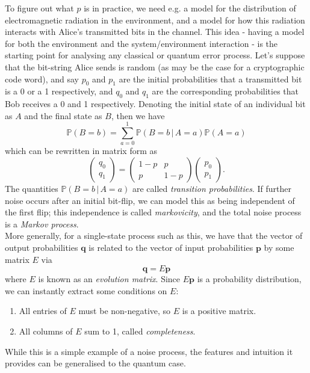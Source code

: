 \documentclass[12pt,a4paper]{report}
\numberwithin{equation}{section}
\theoremstyle{definition}
\theoremstyle{theorem}
\theoremstyle{theorem}
\theoremstyle{example}
\theoremstyle{definition}
\begin{document}
To figure out what $p$ is in practice, we need e.g. a model for the distribution of electromagnetic radiation in the environment, and a model for how this radiation interacts with Alice's transmitted bits in the channel. This idea - having a model for both the environment and the system/environment interaction - is the starting point for analysing any classical or quantum error process. Let's suppose that the bit-string Alice sends is random (as may be the case for a cryptographic code word), and say $p_{0}$ and $p_{1}$ are the initial probabilities that a transmitted bit is a 0 or a 1 respectively, and $q_{0}$ and $q_{1}$ are the corresponding probabilities that Bob receives a 0 and 1 respectively. Denoting the initial state of an individual bit as $A$ and the final state as $B$, then we have
\begin{equation}
	\mathbb{P}(B=b)=\sum_{a=0}^{1}\mathbb{P}(B=b\,|\,A=a)\mathbb{P}(A=a)
\end{equation}
which can be rewritten in matrix form as
\begin{equation}\label{cmat}
	\begin{pmatrix}
		q_{0}\\q_{1}
	\end{pmatrix}=\begin{pmatrix}1-p&p\\p&1-p\end{pmatrix}\begin{pmatrix}
	p_{0}\\p_{1}
\end{pmatrix}.
\end{equation}
The quantities $\mathbb{P}(B=b\,|\,A=a)$ are called \textit{transition probabilities}. If further noise occurs after an initial bit-flip, we can model this as being independent of the first flip; this independence is called \textit{markovicity}, and the total noise process is a \textit{Markov process}.\\
More generally, for a single-state process such as this, we have that the vector of output probabilities $\mathbf{q}$ is related to the vector of input probabilities $\mathbf{p}$ by some matrix $E$ via
\begin{equation} \label{cprob}
	\mathbf{q}=E\mathbf{p}
\end{equation}
where $E$ is known as an \textit{evolution matrix}. Since $E\mathbf{p}$ is a probability distribution, we can instantly extract some conditions on $E$:
\begin{enumerate}
	\item All entries of $E$ must be non-negative, so $E$ is a positive matrix.
	\item All columns of $E$ sum to 1, called \textit{completeness}.
\end{enumerate}
While this is a simple example of a noise process, the features and intuition it provides can be generalised to the quantum case.
\end{document}

